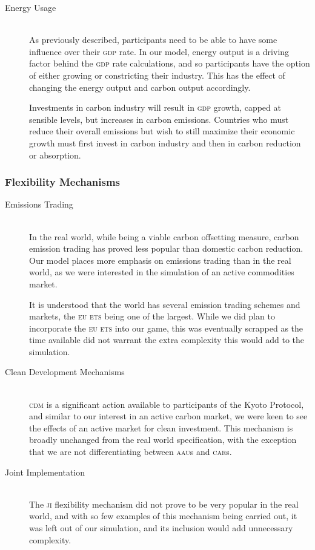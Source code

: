 \begin{description}
\item [Energy Usage] \hfill \\ 
As previously described, participants need to be able to have some influence over their \textsc{gdp} rate. In our model, energy output is a driving factor behind the \textsc{gdp} rate calculations, and so participants have the option of either growing or constricting their industry. This has the effect of changing the energy output and carbon output accordingly.

Investments in carbon industry will result in \textsc{gdp} growth, capped at sensible levels, but increases in carbon emissions. Countries who must reduce their overall emissions but wish to still maximize their economic growth must first invest in carbon industry and then in carbon reduction or absorption.
\end{description}

\subsubsection{Flexibility Mechanisms}

\begin{description}
\item [Emissions Trading] \hfill \\ 
In the real world, while being a viable carbon offsetting measure, carbon emission trading has proved less popular than domestic carbon reduction. Our model places more emphasis on emissions trading than in the real world, as we were interested in the simulation of an active commodities market.

It is understood that the world has several emission trading schemes and markets, the \textsc{eu ets} being one of the largest. While we did plan to incorporate the \textsc{eu ets} into our game, this was eventually scrapped as the time available did not warrant the extra complexity this would add to the simulation.

\item [Clean Development Mechanisms] \hfill \\
\textsc{cdm} is a significant action available to participants of the Kyoto Protocol, and similar to our interest in an active carbon market, we were keen to see the effects of an active market for clean investment. This mechanism is broadly unchanged from the real world specification, with the exception that we are not differentiating between \textsc{aau}s and \textsc{car}s.

\item [Joint Implementation] \hfill \\ 
The \textsc{ji} flexibility mechanism did not prove to be very popular in the real world, and with so few examples of this mechanism being carried out, it was left out of our simulation, and its inclusion would add unnecessary complexity.
\end{description}	
	
